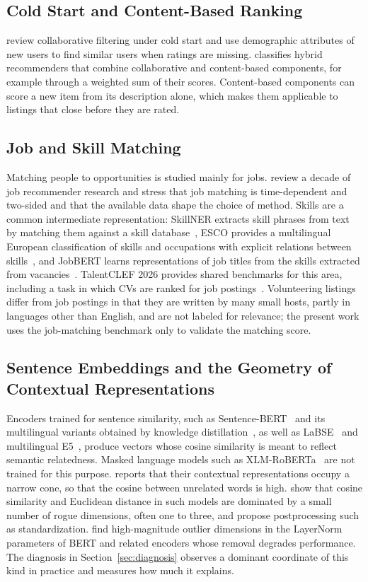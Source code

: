 \documentclass[CHICAGO]{USG}
\begin{document}
\subsection{Cold Start and Content-Based Ranking}
\citet{lika2014} review collaborative filtering under cold start and use demographic attributes of new users to find similar users when ratings are missing. \citet{burke2002} classifies hybrid recommenders that combine collaborative and content-based components, for example through a weighted sum of their scores. Content-based components can score a new item from its description alone, which makes them applicable to listings that close before they are rated.

\subsection{Job and Skill Matching}
Matching people to opportunities is studied mainly for jobs. \citet{deruijt2021review} review a decade of job recommender research and stress that job matching is time-dependent and two-sided and that the available data shape the choice of method. Skills are a common intermediate representation: SkillNER extracts skill phrases from text by matching them against a skill database~\citep{skillner}, ESCO provides a multilingual European classification of skills and occupations with explicit relations between skills~\citep{esco}, and JobBERT learns representations of job titles from the skills extracted from vacancies~\citep{decorte2021jobbert}. TalentCLEF 2026 provides shared benchmarks for this area, including a task in which CVs are ranked for job postings~\citep{talentclef2026,gasco2026overview}. Volunteering listings differ from job postings in that they are written by many small hosts, partly in languages other than English, and are not labeled for relevance; the present work uses the job-matching benchmark only to validate the matching score.

\subsection{Sentence Embeddings and the Geometry of Contextual Representations}
Encoders trained for sentence similarity, such as Sentence-BERT~\citep{reimers2019} and its multilingual variants obtained by knowledge distillation~\citep{reimers2020}, as well as LaBSE~\citep{feng2022} and multilingual E5~\citep{wang2024me5}, produce vectors whose cosine similarity is meant to reflect semantic relatedness. Masked language models such as XLM-RoBERTa~\citep{conneau2020} are not trained for this purpose. \citet{ethayarajh2019} reports that their contextual representations occupy a narrow cone, so that the cosine between unrelated words is high. \citet{timkey2021} show that cosine similarity and Euclidean distance in such models are dominated by a small number of rogue dimensions, often one to three, and propose postprocessing such as standardization. \citet{kovaleva2021} find high-magnitude outlier dimensions in the LayerNorm parameters of BERT and related encoders whose removal degrades performance. The diagnosis in Section~\ref{sec:diagnosis} observes a dominant coordinate of this kind in practice and measures how much it explains.
\end{document}
